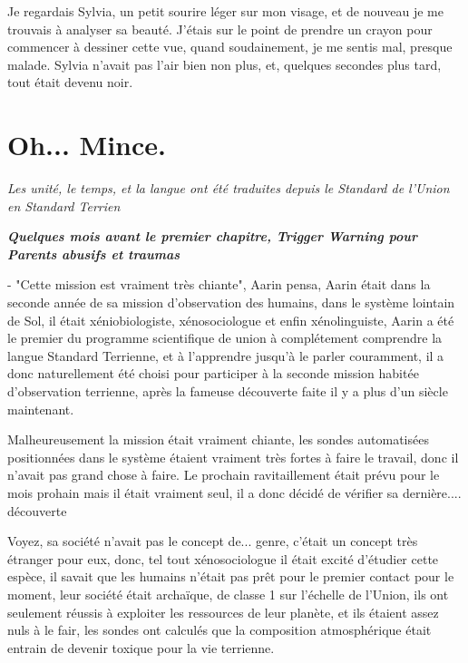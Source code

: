\documentclass[12pt,hidelinks,a4paper]{book}
\begin{document}
Je regardais Sylvia, un petit sourire léger sur mon visage, et de
nouveau je me trouvais à analyser sa beauté. J'étais sur le point
de prendre un crayon pour commencer à dessiner cette vue, quand soudainement,
je me sentis mal, presque malade. Sylvia n'avait pas l'air bien non
plus, et, quelques secondes plus tard, tout était devenu noir.



\chapter{Oh... Mince.}

\textit{Les unité, le temps, et la langue ont été traduites depuis le Standard de l'Union en Standard Terrien}\par
\textit{\textbf{Quelques mois avant le premier chapitre, Trigger Warning pour Parents abusifs et traumas}}\par
\bigskip
- "Cette mission est vraiment très chiante", Aarin pensa, 
Aarin était dans la seconde année de sa mission d'observation des humains, dans le système lointain de Sol,
il était xéniobiologiste, xénosociologue et enfin xénolinguiste, 
Aarin a été le premier du programme scientifique de \gls{union} à complétement comprendre 
la langue Standard Terrienne, et à l'apprendre jusqu'à le parler couramment,
il a donc naturellement été choisi pour participer à la seconde mission habitée d'observation terrienne,
après la fameuse découverte faite il y a plus d'un siècle maintenant.\par
\bigskip

Malheureusement la mission était vraiment chiante, les sondes automatisées positionnées dans le système étaient vraiment
très fortes à faire le travail, donc il n'avait pas grand chose à faire. Le prochain ravitaillement était 
prévu pour le mois prohain mais il était vraiment seul, il a donc décidé de vérifier sa dernière.... découverte\par
\bigskip

Voyez, sa société n'avait pas le concept de... genre, c'était un concept très étranger pour eux, donc, 
tel tout xénosociologue il était excité d'étudier cette espèce, il savait que les humains n'était pas 
prêt pour le premier contact pour le moment, leur société était archaïque, de classe 1 sur l'échelle de l'Union, 
ils ont seulement réussis à exploiter les ressources de leur planète, et ils étaient assez nuls à le fair, les sondes 
ont calculés que la composition atmosphérique était entrain de devenir toxique pour la vie terrienne.\par 
\bigskip
\end{document}
